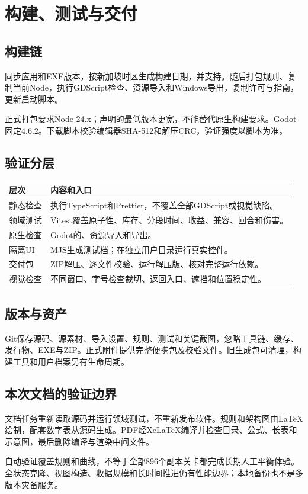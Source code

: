 \chapter{构建、测试与交付}
\section{构建链}
同步应用和EXE版本，按新加坡时区生成构建日期，并支持。随后打包规则、复制当前Node，执行GDScript检查、资源导入和Windows导出，复制许可与指南，更新启动脚本。

正式打包要求Node 24.x；声明的最低版本更宽，不能替代原生构建要求。Godot固定4.6.2。下载脚本校验编辑器SHA-512和解压CRC，验证强度以脚本为准。

\section{验证分层}
\begin{small}\noindent\begin{tabularx}{\linewidth}{@{}P{28mm}Y@{}}
\toprule 层次 & 内容和入口\\\midrule
静态检查 & 执行TypeScript和Prettier，不覆盖全部GDScript或视觉缺陷。\\
领域测试 & Vitest覆盖原子性、库存、分段时间、收益、兼容、回合和伤害。\\
原生检查 & Godot的、资源导入和导出。\\
隔离UI & MJS生成测试档；在独立用户目录运行真实控件。\\
交付包 & ZIP解压、逐文件校验、运行解压版、核对完整运行依赖。\\
视觉检查 & 不同窗口、字号检查裁切、返回入口、遮挡和位置稳定性。\\\bottomrule
\end{tabularx}\end{small}

\section{版本与资产}
Git保存源码、源素材、导入设置、规则、测试和关键截图，忽略工具链、缓存、发行物、EXE与ZIP。正式附件提供完整便携包及校验文件。旧生成包可清理，构建工具和用户档案另有生命周期。

\section{本次文档的验证边界}
文档任务重新读取源码并运行领域测试，不重新发布软件。规则和架构图由LaTeX绘制，配套数字表从源码生成。PDF经XeLaTeX编译并检查目录、公式、长表和示意图，最后删除编译与渲染中间文件。

自动验证覆盖规则和曲线，不等于全部896个副本关卡都完成长期人工平衡体验。全状态克隆、视图构造、收据规模和长时间推进仍有性能边界；本地备份也不是多版本灾备服务。

